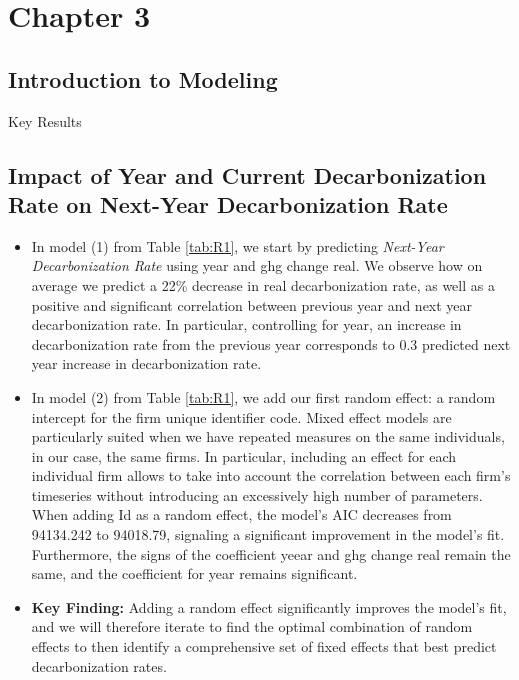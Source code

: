 \chapter{Chapter 3}

\section{Introduction to Modeling}
Key Results

\section{Impact of Year and Current Decarbonization Rate on Next-Year Decarbonization Rate}
\begin{itemize}
    \item In model (1) from Table \ref{tab:R1}, we start by predicting \textit{Next-Year Decarbonization Rate} using year and ghg change real. We observe how on average we predict a 22\% decrease in real decarbonization rate, as well as a positive and significant correlation between previous year and next year decarbonization rate. In particular, controlling for year, an increase in decarbonization rate from the previous year corresponds to 0.3 predicted next year increase in decarbonization rate. 
    \item In model (2) from Table \ref{tab:R1}, we add our first random effect: a random intercept for the firm unique identifier code. Mixed effect models are particularly suited when we have repeated measures on the same individuals, in our case, the same firms. In particular, including an effect for each individual firm allows to take into account the correlation between each firm's timeseries without introducing an excessively high number of parameters. When adding Id as a random effect, the model's AIC decreases from 94134.242 to 94018.79, signaling a significant improvement in the model's fit. Furthermore, the signs of the coefficient yeear and ghg change real remain the same, and the coefficient for year remains significant. 
    \item \textbf{Key Finding:} Adding a random effect significantly improves the model's fit, and we will therefore iterate to find the optimal combination of random effects to then identify a comprehensive set of fixed effects that best predict decarbonization rates.
\end{itemize}







